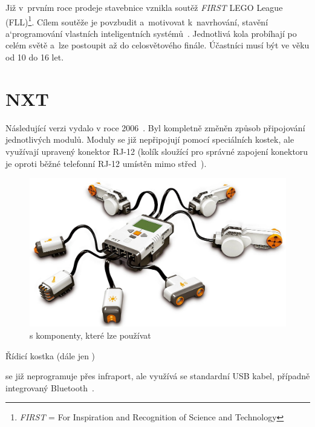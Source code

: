 Již v~prvním roce prodeje stavebnice vznikla soutěž {\it FIRST} LEGO League (FLL)\footnote{{\it FIRST} = For Inspiration and Recognition of Science and Technology}. 
Cílem soutěže je povzbudit a~motivovat k~navrhování, stavění a`programování vlastních inteligentních systémů~\cite{lego_FLL-about}. 
Jednotlivá kola probíhají po celém světě a~lze postoupit až do celosvětového finále. %
Účastníci musí být ve věku od 10 do 16 let. 

\section{\legoM{ }NXT}

Následující verzi vydalo \lego{ }v roce 2006~\cite{lego_mindstormsHistory}. 
Byl kompletně změněn způsob připojování jednotlivých modulů. 
Moduly se již nepřipojují pomocí speciálních \lego{ }kostek, ale využívají upravený konektor RJ-12 %
(kolík sloužící pro správné zapojení konektoru je oproti běžné telefonní RJ-12 umístěn mimo střed~\cite{legoMindstorms_rj12-connector}). %

\begin{figure}[h]
	\centering
	\includegraphics[width=\textwidth]{images/lego-mindstorms-nxt_with-modules.jpg}
	\caption[\legoNXT{ }s komponenty, které lze používat]{\legoNXT{ }s komponenty, které lze používat\protect\footnotemark}
	\label{fig:lego-mindstorms-nxt_with-modules}
\end{figure}

Řídicí kostka (dále jen \brick{}) %

se již neprogramuje přes infraport, ale využívá se standardní USB kabel, případně integrovaný Bluetooth~\cite{legoMindstormsNXT_hardware}.


